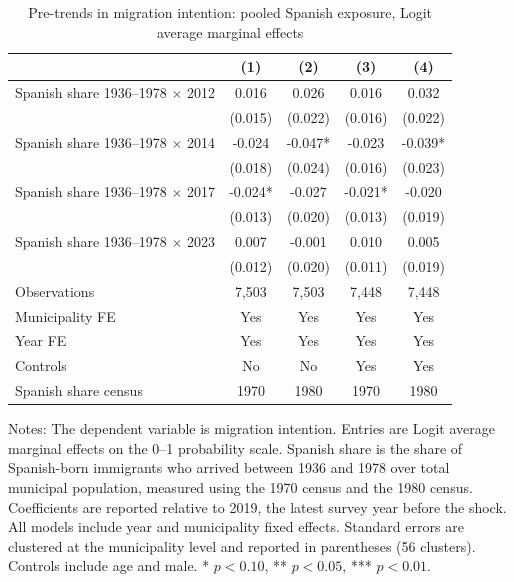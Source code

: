 \begin{table}[!htbp]
\normalsize
\renewcommand{\arraystretch}{1.25}
\setlength{\tabcolsep}{6pt}
\centering
\caption{Pre-trends in migration intention: pooled Spanish exposure, Logit average marginal effects}
\label{tab:pooled_pretrends_ame_stata}
\setlength{\tabcolsep}{4pt}
\captionsetup{justification=centering}
\begin{tabular}{lcccc}
\hline
 & (1) & (2) & (3) & (4) \\
\hline
Spanish share 1936--1978 \(\times\) 2012 & 0.016 & 0.026 & 0.016 & 0.032 \\
 & (0.015) & (0.022) & (0.016) & (0.022) \\
Spanish share 1936--1978 \(\times\) 2014 & -0.024 & -0.047* & -0.023 & -0.039* \\
 & (0.018) & (0.024) & (0.016) & (0.023) \\
Spanish share 1936--1978 \(\times\) 2017 & -0.024* & -0.027 & -0.021* & -0.020 \\
 & (0.013) & (0.020) & (0.013) & (0.019) \\
Spanish share 1936--1978 \(\times\) 2023 & 0.007 & -0.001 & 0.010 & 0.005 \\
 & (0.012) & (0.020) & (0.011) & (0.019) \\
\hline
Observations &        7,503 &        7,503 &        7,448 &        7,448 \\
Municipality FE & Yes & Yes & Yes & Yes \\
Year FE & Yes & Yes & Yes & Yes \\
Controls & No & No & Yes & Yes \\
Spanish share census & 1970 & 1980 & 1970 & 1980 \\
\hline
\end{tabular}
\par\vspace{1.5mm}
\begin{minipage}{0.98\linewidth}
\footnotesize\setlength{\parindent}{0pt}\setlength{\parskip}{1pt}
Notes: The dependent variable is migration intention. Entries are Logit average marginal effects on the 0--1 probability scale. Spanish share is the share of Spanish-born immigrants who arrived between 1936 and 1978 over total municipal population, measured using the 1970 census and the 1980 census. Coefficients are reported relative to 2019, the latest survey year before the shock. All models include year and municipality fixed effects. Standard errors are clustered at the municipality level and reported in parentheses (56 clusters). Controls include age and male. * \(p<0.10\), ** \(p<0.05\), *** \(p<0.01\).
\end{minipage}
\end{table}
